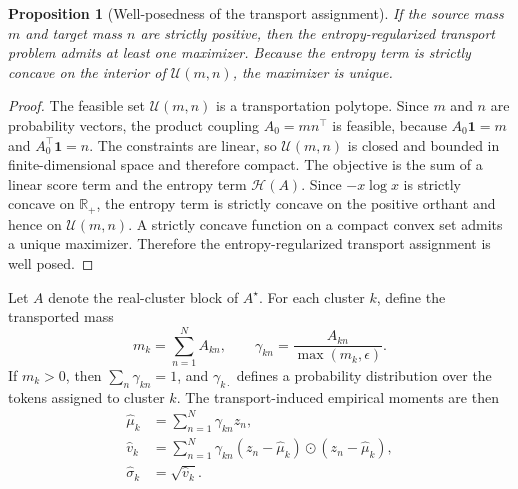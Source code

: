 \documentclass[journal]{IEEEtran}
\newtheorem{proposition}{Proposition}
\begin{document}
\begin{proposition}[Well-posedness of the transport assignment]
If the source mass \(m\) and target mass \(n\) are strictly positive, then the entropy-regularized transport problem admits at least one maximizer. Because the entropy term is strictly concave on the interior of \(\mathcal{U}(m,n)\), the maximizer is unique.
\end{proposition}
\begin{proof}
The feasible set \(\mathcal{U}(m,n)\) is a transportation polytope. Since \(m\) and \(n\) are probability vectors, the product coupling \(A_0 = mn^\top\) is feasible, because \(A_0\mathbf{1}=m\) and \(A_0^\top\mathbf{1}=n\). The constraints are linear, so \(\mathcal{U}(m,n)\) is closed and bounded in finite-dimensional space and therefore compact. The objective is the sum of a linear score term and the entropy term \(\mathcal{H}(A)\). Since \(-x\log x\) is strictly concave on \(\mathbb{R}_+\), the entropy term is strictly concave on the positive orthant and hence on \(\mathcal{U}(m,n)\). A strictly concave function on a compact convex set admits a unique maximizer. Therefore the entropy-regularized transport assignment is well posed.
\end{proof}

Let \(A\) denote the real-cluster block of \(A^\star\). For each cluster \(k\), define the transported mass
\[
m_k = \sum_{n=1}^N A_{kn},
\qquad
\gamma_{kn} = \frac{A_{kn}}{\max(m_k,\epsilon)}.
\]
If \(m_k > 0\), then \(\sum_n \gamma_{kn} = 1\), and \(\gamma_{k\cdot}\) defines a probability distribution over the tokens assigned to cluster \(k\). The transport-induced empirical moments are then
\begin{align}
\hat{\mu}_k &= \sum_{n=1}^N \gamma_{kn} z_n, \label{eq:mu_hat}\\
\hat{v}_k &= \sum_{n=1}^N \gamma_{kn} (z_n - \hat{\mu}_k) \odot (z_n - \hat{\mu}_k), \label{eq:var_hat}\\
\hat{\sigma}_k &= \sqrt{\hat{v}_k}. \label{eq:sigma_hat}
\end{align}
\end{document}
